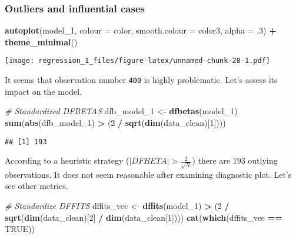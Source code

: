 \documentclass[]{article}
\newenvironment{Shaded}{\begin{snugshade}}{\end{snugshade}}
\newcommand{\CommentTok}[1]{\textcolor[rgb]{0.56,0.35,0.01}{\textit{#1}}}
\newcommand{\DataTypeTok}[1]{\textcolor[rgb]{0.13,0.29,0.53}{#1}}
\newcommand{\DecValTok}[1]{\textcolor[rgb]{0.00,0.00,0.81}{#1}}
\newcommand{\FloatTok}[1]{\textcolor[rgb]{0.00,0.00,0.81}{#1}}
\newcommand{\KeywordTok}[1]{\textcolor[rgb]{0.13,0.29,0.53}{\textbf{#1}}}
\newcommand{\NormalTok}[1]{#1}
\newcommand{\OperatorTok}[1]{\textcolor[rgb]{0.81,0.36,0.00}{\textbf{#1}}}
\newcommand{\OtherTok}[1]{\textcolor[rgb]{0.56,0.35,0.01}{#1}}
\newcommand{\StringTok}[1]{\textcolor[rgb]{0.31,0.60,0.02}{#1}}
\begin{document}
\hypertarget{outliers-and-influential-cases}{%
\subsubsection{Outliers and influential
cases}\label{outliers-and-influential-cases}}

\begin{Shaded}
\begin{Highlighting}[]
\KeywordTok{autoplot}\NormalTok{(model_}\DecValTok{1}\NormalTok{, }\DataTypeTok{colour =}\NormalTok{ color, }\DataTypeTok{smooth.colour =}\NormalTok{ color3, }\DataTypeTok{alpha =} \FloatTok{.3}\NormalTok{) }\OperatorTok{+}\StringTok{ }\KeywordTok{theme_minimal}\NormalTok{()}
\end{Highlighting}
\end{Shaded}

\texttt{[image: regression\_1\_files/figure-latex/unnamed-chunk-28-1.pdf]}

It seems that observation number \texttt{400} is highly problematic.
Let's assess its impact on the model.

\begin{Shaded}
\begin{Highlighting}[]
\CommentTok{# Standardized DFBETAS}
\NormalTok{dfb_model_}\DecValTok{1}\NormalTok{ <-}\StringTok{ }\KeywordTok{dfbetas}\NormalTok{(model_}\DecValTok{1}\NormalTok{)}
\KeywordTok{sum}\NormalTok{(}\KeywordTok{abs}\NormalTok{(dfb_model_}\DecValTok{1}\NormalTok{) }\OperatorTok{>}\StringTok{ }\NormalTok{(}\DecValTok{2} \OperatorTok{/}\StringTok{ }\KeywordTok{sqrt}\NormalTok{(}\KeywordTok{dim}\NormalTok{(data_clean)[}\DecValTok{1}\NormalTok{])))}
\end{Highlighting}
\end{Shaded}

\begin{verbatim}
## [1] 193
\end{verbatim}

According to a heuristic strategy (\(|DFBETA| > \frac{2}{\sqrt{N}}\))
there are \(193\) outlying observations. It does not seem reasonable
after examining diagnostic plot. Let's see other metrics.

\begin{Shaded}
\begin{Highlighting}[]
\CommentTok{# Standardize DFFITS}
\NormalTok{dffits_vec <-}\StringTok{ }\KeywordTok{dffits}\NormalTok{(model_}\DecValTok{1}\NormalTok{) }\OperatorTok{>}\StringTok{ }\NormalTok{(}\DecValTok{2} \OperatorTok{/}\StringTok{ }\KeywordTok{sqrt}\NormalTok{(}\KeywordTok{dim}\NormalTok{(data_clean)[}\DecValTok{2}\NormalTok{] }\OperatorTok{/}\StringTok{ }\KeywordTok{dim}\NormalTok{(data_clean[}\DecValTok{1}\NormalTok{])))}
\KeywordTok{cat}\NormalTok{(}\KeywordTok{which}\NormalTok{(dffits_vec }\OperatorTok{==}\StringTok{ }\OtherTok{TRUE}\NormalTok{))}
\end{Highlighting}
\end{Shaded}
\end{document}
